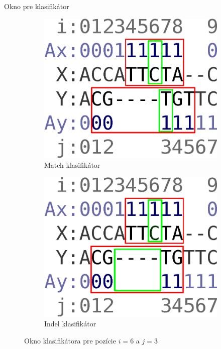 \documentclass[xcolor=dvipsnames, compress, 12pt]{beamer}
\theoremstyle{definition}
\begin{document}
\begin{frame}{Okno pre klasifikátor}
\begin{figure}[h]
        \centering
        \begin{subfigure}[b]{0.35\textwidth}
                \includegraphics[width=\textwidth]{images/window_m}
                \caption{Match klasifikátor}
                \label{fig:window-m}
        \end{subfigure}%
        \qquad\qquad %
        \begin{subfigure}[b]{0.35\textwidth}
                \includegraphics[width=\textwidth]{images/window_i}
                \caption{Indel klasifikátor}
                \label{fig:window-i}
        \end{subfigure}
        \caption[Okno klasifikátora]{Okno klasifikátora pre pozície $i = 6$ a $j = 3$}
\end{figure}
\end{frame}
\end{document}

